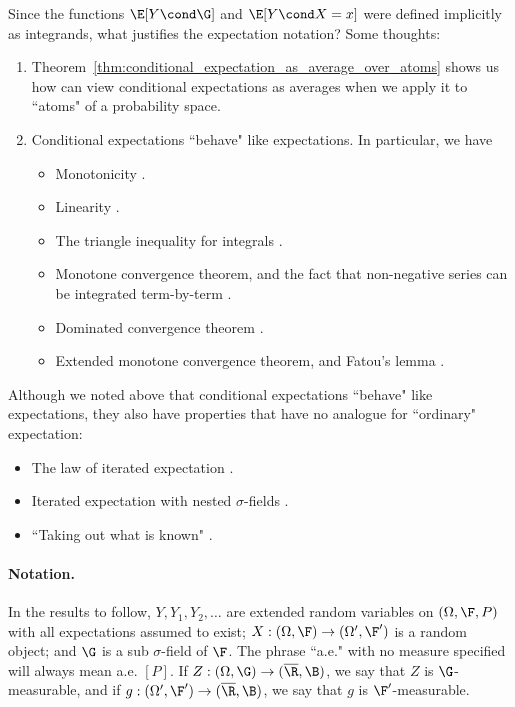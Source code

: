 \documentclass{article} %
\begin{document}
Since the functions $\E[Y \cond \G]$ and $\E[Y \cond X = x]$ were defined implicitly as integrands, what justifies the expectation notation?  Some thoughts:

\begin{enumerate}
\item 
Theorem~\ref{thm:conditional_expectation_as_average_over_atoms} shows us how can view conditional expectations as averages when we apply it to ``atoms" of a probability space. 	
\item Conditional expectations ``behave" like expectations.  In particular, we have
\begin{itemize}
\item Monotonicity \cite[Thm. 5.5.1b]{ash2000probability}.
\item Linearity \cite[Thm. 5.5.2]{ash2000probability}.	
\item The triangle inequality for integrals \cite[Thm. 5.5.1c]{ash2000probability}.
\item Monotone convergence theorem, and the fact that non-negative series can be integrated term-by-term  \cite[Thm. 5.5.3]{ash2000probability}.
\item Dominated convergence theorem \cite[Thm. 5.5.5]{ash2000probability}.
\item Extended monotone convergence theorem, and Fatou's lemma \cite[Thm. 5.5.6]{ash2000probability}.
\end{itemize}
\end{enumerate}



Although we noted above that conditional expectations ``behave" like expectations, they also have properties that have no analogue for ``ordinary" expectation:

\begin{itemize}
\item The law of iterated expectation \cite[Thm. 5.5.4]{ash2000probability}.	
\item Iterated expectation with nested $\sigma$-fields \cite[Thm. 5.5.10]{ash2000probability}.
\item ``Taking out what is known" \cite[Thm. 5.5.11]{ash2000probability}.
\end{itemize}



\paragraph{Notation.} In the results to follow, $Y, Y_1, Y_2, \hdots$ are extended random variables on $(\Omega, \F,P)$ with all expectations assumed to exist; $X: (\Omega, \F) \to (\Omega', \F')$ is a random object; and $\G$ is a sub $\sigma$-field of $\F$. The phrase ``a.e." with no measure specified will always mean a.e. $[P]$.  If $Z:(\Omega, \G) \to (\overline{\R}, \B)$, we say that $Z$ is $\G$-measurable, and if $g:(\Omega', \F') \to (\overline{\R}, \B)$, we say that $g$ is $\F'$-measurable.
\end{document}
